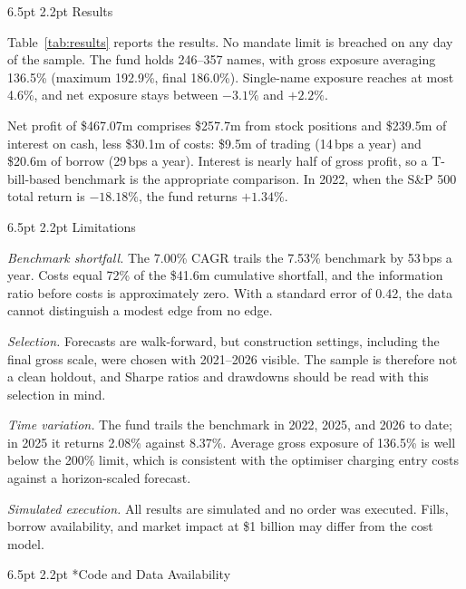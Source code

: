 \documentclass[10pt,twocolumn,letterpaper]{article}
\makeatletter
\renewcommand{\section}{\@startsection{section}{1}{\z@}%
  {6.5pt \@plus 2pt \@minus 1pt}%
  {2.2pt}%
  {\normalfont\normalsize\bfseries}}
\makeatother
\begin{document}
\section{Results}

Table~\ref{tab:results} reports the results. No mandate limit is breached on any day of the sample. The fund holds 246--357 names, with gross exposure averaging 136.5\% (maximum 192.9\%, final 186.0\%). Single-name exposure reaches at most 4.6\%, and net exposure stays between $-3.1\%$ and $+2.2\%$.

Net profit of \$467.07m comprises \$257.7m from stock positions and \$239.5m of interest on cash, less \$30.1m of costs: \$9.5m of trading (14\,bps a year) and \$20.6m of borrow (29\,bps a year). Interest is nearly half of gross profit, so a T-bill-based benchmark is the appropriate comparison. In 2022, when the S\&P 500 total return is $-18.18\%$, the fund returns $+1.34\%$.

\section{Limitations}

\textit{Benchmark shortfall.} The 7.00\% CAGR trails the 7.53\% benchmark by 53\,bps a year. Costs equal 72\% of the \$41.6m cumulative shortfall, and the information ratio before costs is approximately zero. With a standard error of 0.42, the data cannot distinguish a modest edge from no edge.

\textit{Selection.} Forecasts are walk-forward, but construction settings, including the final gross scale, were chosen with 2021--2026 visible. The sample is therefore not a clean holdout, and Sharpe ratios and drawdowns should be read with this selection in mind.

\textit{Time variation.} The fund trails the benchmark in 2022, 2025, and 2026 to date; in 2025 it returns 2.08\% against 8.37\%. Average gross exposure of 136.5\% is well below the 200\% limit, which is consistent with the optimiser charging entry costs against a horizon-scaled forecast.

\textit{Simulated execution.} All results are simulated and no order was executed. Fills, borrow availability, and market impact at \$1 billion may differ from the cost model.

\section*{Code and Data Availability}
\end{document}
